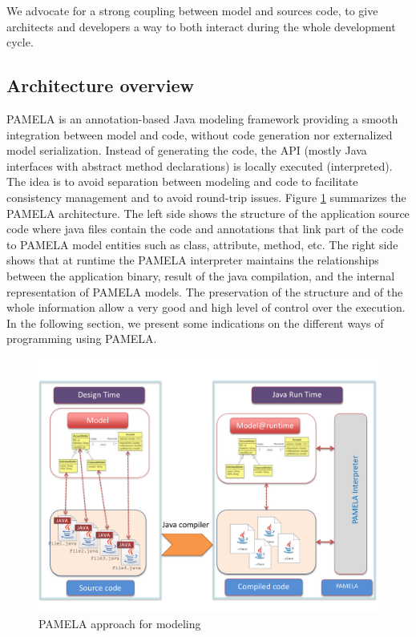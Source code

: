 We advocate for a strong coupling between model and sources code, to give architects and developers a way to both interact during the whole development cycle. 

\subsection{Architecture overview}

PAMELA is an annotation-based Java modeling framework providing a smooth integration between model and code, without code generation nor externalized model serialization. Instead of generating the code, the API (mostly Java interfaces with abstract method declarations) is locally executed (interpreted). The idea is to avoid separation between modeling and code to facilitate consistency management and to avoid round-trip issues. Figure \ref{fig:PamelaVision} summarizes the PAMELA architecture.
The left side shows the structure of the application source code where java files contain the code and annotations that link part of the code to PAMELA model entities such as class, attribute, method, etc. The right side shows that at runtime the PAMELA interpreter maintains the relationships between the application binary, result of the java compilation, and the internal representation of PAMELA models. The preservation of the structure and of the whole information allow a very good and high level of control over the execution. In the following section, we present some indications on the different ways of programming using PAMELA.

\begin{figure}
    \centering
    \includegraphics[width=1.0 \columnwidth]{PamelaVisionV2.pdf}
    \caption{PAMELA approach for modeling}
    \label{fig:PamelaVision}
\end{figure}

